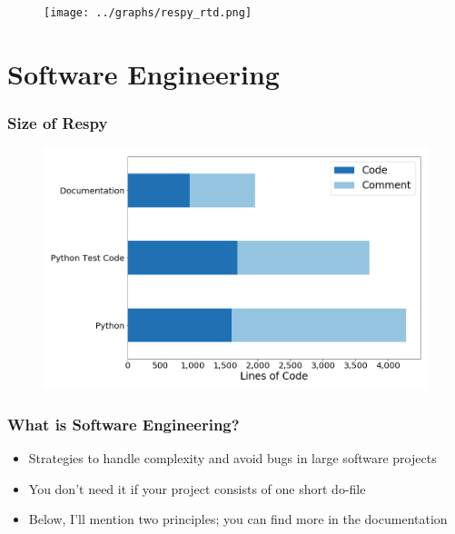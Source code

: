 \documentclass[11pt]{beamer}
\begin{document}
\begin{frame}
    \begin{figure}
      \texttt{[image: ../graphs/respy\_rtd.png]}
    \end{figure}
\end{frame}




\section{Software Engineering}


\begin{frame}[c]\frametitle{Size of Respy}
    \begin{figure}
      \includegraphics[width=\textwidth]{../../cloc/lines_of_code_by_language.png}
    \end{figure}
\end{frame}

\begin{frame}[c]\frametitle{What is Software Engineering?}
    \begin{itemize}
        \item Strategies to handle complexity and avoid bugs in large software projects
        \item You don't need it if your project consists of one short do-file %

        \item Below, I'll mention two principles; you can find more in the documentation
    \end{itemize}
\end{frame}
\end{document}
